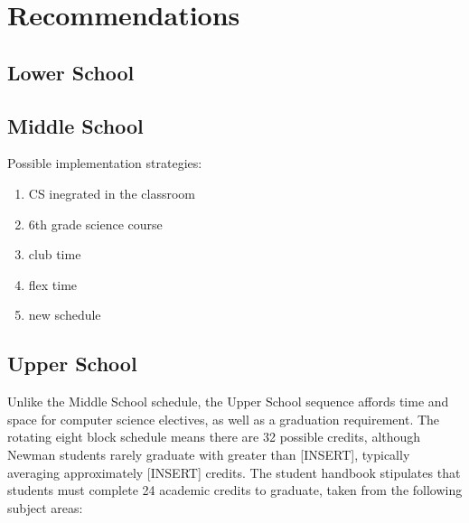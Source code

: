 
\chapter{Recommendations} %

\label{Chapter3} %



\section{Lower School}
\section{Middle School}
Possible implementation strategies:
\begin{enumerate}
	\item CS inegrated in the classroom
	\item 6th grade science course
	\item club time
	\item flex time
	\item new schedule
\end{enumerate}

\section{Upper School}
Unlike the Middle School schedule, the Upper School sequence affords time and space for computer science electives, as well as a graduation requirement. The rotating eight block schedule means there are 32 possible credits, although Newman students rarely graduate with greater than [INSERT], typically averaging approximately [INSERT] credits. The student handbook stipulates that students must complete 24 academic credits to graduate, taken from the following subject areas: \par

